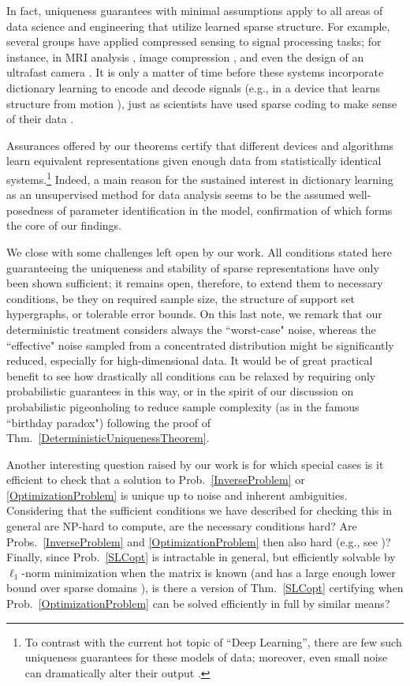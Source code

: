 \documentclass[journal, twocolumn]{IEEEtran}
\begin{document}
In fact, uniqueness guarantees with minimal assumptions apply to all areas of data science and engineering that utilize learned sparse structure. For example, several groups have applied compressed sensing to signal processing tasks; for instance, in MRI analysis \cite{lustig2008compressed}, image compression \cite{Duarte08}, and even the design of an ultrafast camera \cite{Gao14}. It is only a matter of time before these systems incorporate dictionary learning to encode and decode signals (e.g., in a device that learns structure from motion \cite{kong2016prior}), just as scientists have used sparse coding to make sense of their data \cite{jung2001imaging, agarwal2014spatially, lee2016sparse, wu2016stability}. 

Assurances offered by our theorems certify that different devices and algorithms learn equivalent representations given enough data from statistically identical systems.\footnote{To contrast with the current hot topic of ``Deep Learning'', there are few such uniqueness guarantees for these models of data; moreover, even small noise can dramatically alter their output \cite{goodfellow2014explaining}.} 
Indeed, a main reason for the sustained interest in dictionary learning as an unsupervised method for data analysis seems to be the assumed well-posedness of parameter identification in the model, confirmation of which forms the core of our findings.

We close with some challenges left open by our work. All conditions stated here guaranteeing the uniqueness and stability of sparse representations have only been shown sufficient; it remains open, therefore, to extend them to necessary conditions, be they on required sample size, the structure of support set hypergraphs, or tolerable error bounds. On this last note, we remark that our deterministic treatment considers always the ``worst-case" noise, whereas the ``effective" noise sampled from a concentrated distribution might be significantly reduced, especially for high-dimensional data. It would be of great practical benefit to see how drastically all conditions can be relaxed by requiring only probabilistic guarantees in this way, or in the spirit of our discussion on probabilistic pigeonholing to reduce sample complexity (as in the famous ``birthday paradox") following the proof of Thm.~\ref{DeterministicUniquenessTheorem}.

Another interesting question raised by our work is for which special cases is it efficient to check that a solution to Prob.~\ref{InverseProblem} or \ref{OptimizationProblem} is unique up to noise and inherent ambiguities. Considering that the sufficient conditions we have described for checking this in general are NP-hard to compute, are the necessary conditions hard? Are Probs.~\ref{InverseProblem} and \ref{OptimizationProblem} then also hard (e.g., see \cite{Tillmann15})? Finally, since Prob.~\ref{SLCopt} is intractable in general, but efficiently solvable by $\ell_1$-norm minimization when the matrix is known (and has a large enough lower bound over sparse domains \cite{eldar2012compressed}), is there a version of Thm.~\ref{SLCopt} certifying when Prob.~\ref{OptimizationProblem} can be solved efficiently in full by similar means?  %
\end{document}
